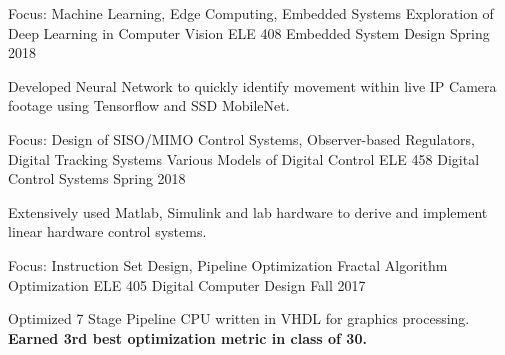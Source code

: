 \ugradheader
\begin{cvprojectentries}
  \cvprojectentry
    {Focus: Machine Learning, Edge Computing, Embedded Systems}
    {Exploration of Deep Learning in Computer Vision}
    {ELE 408 {\cdotp} Embedded System Design}
    {Spring 2018}
    {
      \begin{cvitems}
        \item{Developed Neural Network to quickly identify movement within live IP Camera footage using Tensorflow and SSD MobileNet.}
      \end{cvitems}
    }
  \cvprojectentry
    {Focus: Design of SISO/MIMO Control Systems, Observer-based Regulators, Digital Tracking Systems}
    {Various Models of Digital Control}
    {ELE 458 {\cdotp} Digital Control Systems}
    {Spring 2018}
    {
      \begin{cvitems}
        \item {Extensively used Matlab, Simulink and lab hardware to derive and implement linear hardware control systems.}
      \end{cvitems}
    }
  \cvprojectentry
    {Focus: Instruction Set Design, Pipeline Optimization}
    {Fractal Algorithm Optimization}
    {ELE 405 {\cdotp} Digital Computer Design}
    {Fall 2017}
    {
      \begin{cvitems}
        \item {Optimized 7 Stage Pipeline CPU written in VHDL for graphics processing. \textbf{Earned 3rd best optimization metric in class of 30.}}
      \end{cvitems}
    }
\end{cvprojectentries}

